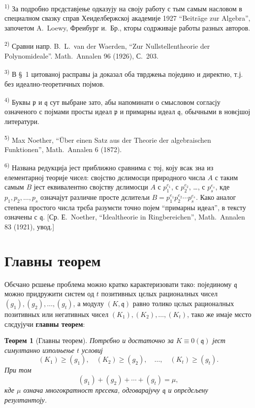 \documentclass[11pt]{article}
\newcommand{\foreign}[1]{#1}
\theoremstyle{plain}
\newtheorem{satz}{Теорем}
\begin{document}
{\footnotesize
\textsuperscript{1)} За подробно прєдставјење одказују на своју работу с тым самым
насловом в специалном свазку справ Хеиделбержској академије 1927
``\foreign{Beiträge zur Algebra}'', започетом \foreign{A.\ Loewy}, Фреибург и.\ Бр., кторы
содрживаје работы разных авторов.

\textsuperscript{2)} Сравни напр. \foreign{B.\ L.\ van der Waerden}, ``\foreign{Zur Nullstellentheorie der Polynomideale}''.
\foreign{Math.\ Annalen} 96 (1926), С.~203.

\textsuperscript{3)} В \S~1 цитованој расправы ја доказал оба тврджења поједино и директно,
т.ј. без идеално-теоретичных појмов.

\textsuperscript{4)} Буквы $\mathfrak{p}$ и $\mathfrak{q}$ сут выбране зато, абы напоминати
о смысловом согласју означеного с појмами просты идеал
$\mathfrak{p}$ и примарны идеал $\mathfrak{q}$, обычными в новєјшој литератури.

\textsuperscript{5)} \foreign{Max Noether}, ``\foreign{Über einen Satz aus der Theorie der algebraischen Funktionen}'',
\foreign{Math.\ Annalen} 6 (1872).

\textsuperscript{6)} Названа редукција јест приближно сравнима с тој, коју всак зна из
елементарној теорије чисел: својство дєлимосци природного числа
$A$ с таким самым $B$ јест еквивалентно својству дєлимосци $A$ с
$p_{1}^{e_{1}}$, с $p_{2}^{e_{2}}$, \ldots, с $p_{s}^{e_{s}}$, кде
$p_{1}, p_{2}, \ldots, p_{s}$ означајут различне просте дєлитељи
$B = p_{1}^{e_{1}}p_{2}^{e_{2}} \cdots p_{s}^{e_{s}}$. Како аналог
степена простого числа трєба разумєти точно појем ``примарны идеал'',
в тексту означены с $\mathfrak{q}$. [Ср. Е.\ Noether,
``\foreign{Idealtheorie in Ringbereichen}'', \foreign{Math.\ Annalen} 83 (1921), увод.]
}

\newpage
\section*{Главны теорем}

Обєчано рєшење проблема можно кратко карактеризовати тако:
појединому $\mathfrak{q}$ можно придружити систем од $t$ позитивных
цєлых рационалных чисел $(g_{1}), (g_{2}), \ldots, (g_{t})$, а
модулу $(K, \mathfrak{q})$ равно толико цєлых рационалных позитивных
или негативных чисел $(K_{1}), (K_{2}), \ldots, (K_{t})$, тако же
имаје мєсто слєдујучи \textbf{главны теорем}:

\begin{satz}[Главны теорем]\label{satz:kap-II}
Потрєбно и достаточно за $K \equiv 0(\mathfrak{q})$ јест
симултанно изполњење $t$ условиј
\[
(K_{1}) \geq (g_{1}), \quad (K_{2}) \geq (g_{2}), \quad\ldots,\quad (K_{t}) \geq (g_{t}).
\]
При том
\[
(g_{1}) + (g_{2}) + \cdots + (g_{t}) = \mu,
\]
кде $\mu$ означа многократност прєсека, одговарајучу
$\mathfrak{q}$ и опрєдєљену резултантоју.
\end{satz}
\end{document}
